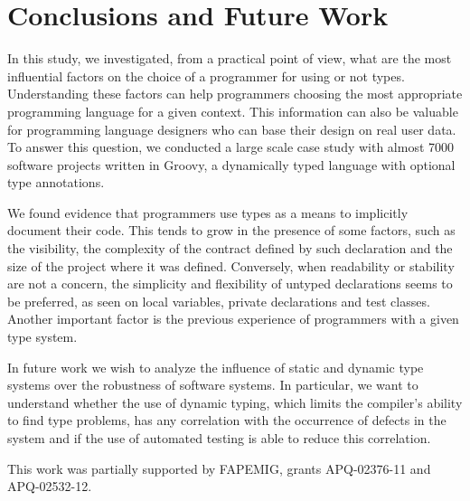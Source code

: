 \documentclass[preprint]{sigplanconf}
\begin{document}
%
%
\section{Conclusions and Future Work\label{conclusion}}
In this study, we investigated, from a practical point of view, what are the most influential factors on the choice of a programmer for using or not types.
Understanding these factors can help programmers choosing the most appropriate programming language for a given context.
This information can also be valuable for programming language designers who can base their design on real user data.
To answer this question, we conducted a large scale case study with almost 7000 software projects written in Groovy, a dynamically typed language with optional type annotations. 

We found evidence that programmers use types as a means to implicitly document their code.
This tends to grow in the presence of some factors, such as the visibility, the complexity of the contract defined by such declaration and the size of the project where it was defined. 
Conversely, when readability or stability are not a concern, the simplicity and flexibility of untyped declarations seems to be preferred, as seen on local variables, private declarations and test classes.
Another important factor is the previous experience of programmers with a given type system.

In future work we wish to analyze the influence of static and dynamic type systems over the robustness of software systems.
In particular, we want to understand whether the use of dynamic typing, which limits the compiler's ability to find type problems, has any correlation with the occurrence of defects in the system and if the use of automated testing is able to reduce this correlation.


\acks
This work was partially supported by FAPEMIG, grants APQ-02376-11 and APQ-02532-12.

\newpage 
\end{document}
